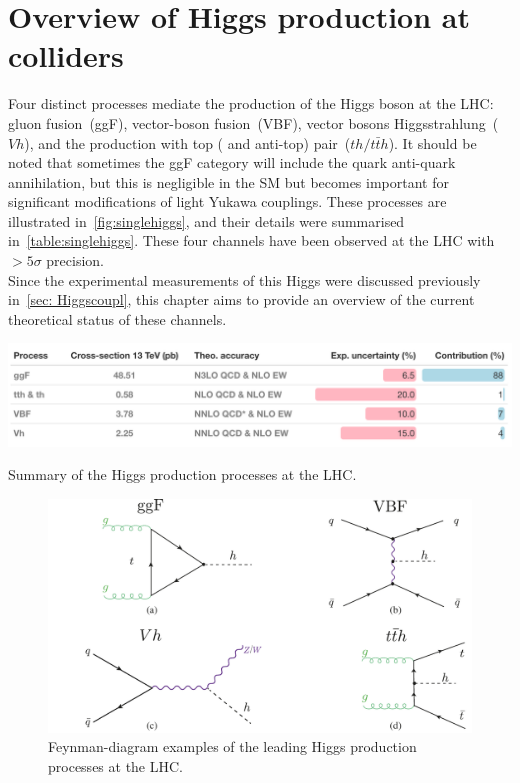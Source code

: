 
\chapter{ Overview of Higgs production at colliders }\label{chap:overviewSingleHiggs}
Four distinct processes mediate the production of the Higgs boson at the LHC: gluon fusion~(ggF), vector-boson fusion~(VBF), vector bosons Higgsstrahlung~($Vh$), and the production with top ( and anti-top) pair~($th / t \bar th$). It should be noted that sometimes the ggF category will include the quark anti-quark annihilation, but this is negligible in the SM but becomes important for significant modifications of light Yukawa couplings. These processes are illustrated in~\autoref{fig:singlehiggs}, and their details were summarised in~\autoref{table:singlehiggs}. These four channels have been observed at the LHC with $>5 \sigma$ precision. \\ 
Since the experimental measurements of this Higgs were discussed previously in~\autoref{sec: Higgscoupl}, this chapter aims to provide an overview of the current theoretical status of these channels.
\begin{table}[htbp!]
	\includegraphics[width=1\textwidth]{single_higgs_table}
	\caption{ Summary  of the Higgs production processes at the LHC. \label{table:singlehiggs} }
\end{table}
\begin{figure}[htbp!]
	\begin{center}
		\includegraphics[width=.75\textwidth]{figures/single_higgs}
		\caption{Feynman-diagram examples of the leading  Higgs production processes  at the LHC. \label{fig:singlehiggs} }
	\end{center}
\end{figure}
